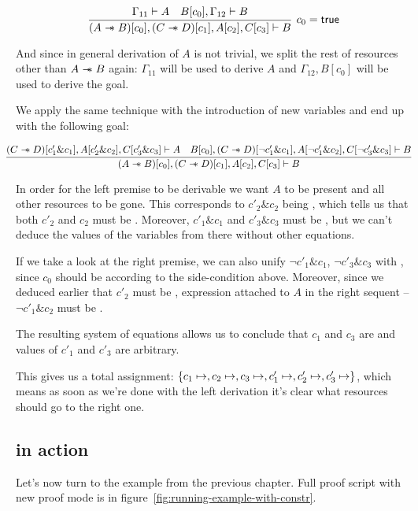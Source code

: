 \[
\infer[c_0 = \true]
      {(A \wand B)[c_0], (C \wand D)[c_1],
        A[c_2], C[c_3] \vdash B}
      { \Gamma_{11} \vdash A &
       B[c_0], \Gamma_{12} \vdash B}
\]

And since in general derivation of \(A\) is not trivial, we split the rest of resources other than \(A \mathrel{-\mkern-6mu*} B\) again: \(\Gamma_{11}\) will be used to derive \(A\) and \(\Gamma_{12}, B[c_0]\) will be used to derive the goal.

We apply the same technique with the introduction of new variables and end up with the following goal:

\[
\hspace{-0.03\linewidth}
\infer{(A \wand B)[c_0], (C \wand D)[c_1], A[c_2], C[c_3] \vdash B}
      {(C \wand D)[c'_1 \& c_1], A[c'_2 \& c_2], C[c'_3 \& c_3] \vdash A &
       B[c_0], (C \wand D)[\neg c'_1 \& c_1], A[\neg c'_1 \& c_2], C[\neg c'_3 \& c_3] \vdash B}
\]

In order for the left premise to be derivable we want \(A\) to be present and all other resources to be gone.
This corresponds to \(c'_2 \& c_2\) being \true, which tells us that both \(c'_2\) and \(c_2\) must be \true.
Moreover, \(c'_1 \& c_1\) and \(c'_3 \& c_3\) must be \false, but we can't deduce the values of the variables from there without other equations.

If we take a look at the right premise, we can also unify \(\neg c'_1 \& c_1\), \(\neg c'_3 \& c_3\) with \false, since \(c_0\) should be \true according to the side-condition above.
Moreover, since we deduced earlier that \(c'_2\) must be \true, expression attached to \(A\) in the right sequent -- \(\neg c'_1 \& c_2\) must be \false.

The resulting system of equations allows us to conclude that \(c_1\) and \(c_3\) are \false and values of \(c'_1\) and \(c'_3\) are arbitrary.

This gives us a total assignment: \(\left\{ c_1 \mapsto , c_2 \mapsto , c_3 \mapsto , c'_1 \mapsto , c'_2 \mapsto , c'_3 \mapsto  \right\}\), which means as soon as we're done with the left derivation it's clear what resources should go to the right one.

\subsection{ in action}
\label{sec:isplit-in-action}

Let's now turn to the example from the previous chapter.
Full proof script with new proof mode is in figure~\ref{fig:running-example-with-constr}.

